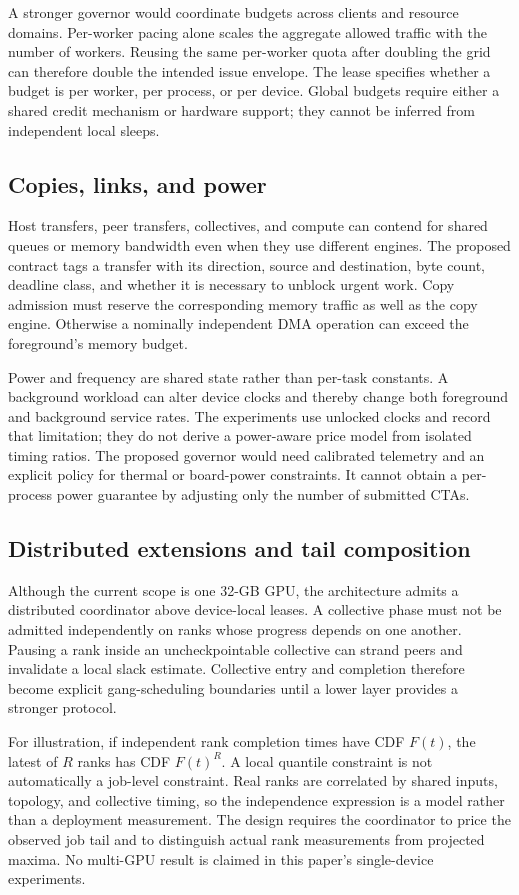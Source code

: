 A stronger governor would coordinate budgets across clients and resource
domains. Per-worker pacing alone scales the aggregate allowed traffic with
the number of workers. Reusing the same per-worker quota after doubling the
grid can therefore double the intended issue envelope. The lease specifies
whether a budget is per worker, per process, or per device. Global budgets
require either a shared credit mechanism or hardware support; they cannot
be inferred from independent local sleeps.

\subsection{Copies, links, and power}
Host transfers, peer transfers, collectives, and compute can contend for
shared queues or memory bandwidth even when they use different engines.
The proposed contract tags a transfer with its direction, source and
destination, byte count, deadline class, and whether it is necessary to
unblock urgent work. Copy admission must reserve the corresponding memory
traffic as well as the copy engine. Otherwise a nominally independent DMA
operation can exceed the foreground's memory budget.

Power and frequency are shared state rather than per-task constants. A
background workload can alter device clocks and thereby change both
foreground and background service rates. The experiments use unlocked
clocks and record that limitation; they do not derive a power-aware price
model from isolated timing ratios. The proposed governor would need
calibrated telemetry and an explicit policy for thermal or board-power
constraints. It cannot obtain a per-process power guarantee by adjusting
only the number of submitted CTAs.

\subsection{Distributed extensions and tail composition}
Although the current scope is one 32-GB GPU, the architecture admits a
distributed coordinator above device-local leases. A collective phase must
not be admitted independently on ranks whose progress depends on one another.
Pausing a rank inside an uncheckpointable collective can strand peers and
invalidate a local slack estimate. Collective entry and completion therefore
become explicit gang-scheduling boundaries until a lower layer provides a
stronger protocol.

For illustration, if independent rank completion times have CDF $F(t)$,
the latest of $R$ ranks has CDF $F(t)^R$. A local quantile constraint is not
automatically a job-level constraint. Real ranks are correlated by shared
inputs, topology, and collective timing, so the independence expression is
a model rather than a deployment measurement. The design requires the
coordinator to price the observed job tail and to distinguish actual rank
measurements from projected maxima. No multi-GPU result is claimed in this
paper's single-device experiments.
